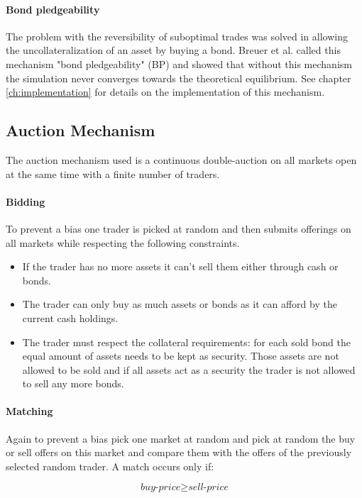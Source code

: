 \documentclass[../Bachelorarbeit.tex]{subfiles}
\begin{document}
\paragraph{Bond pledgeability}
The problem with the reversibility of suboptimal trades was solved in allowing the uncollateralization of an asset by buying a bond. Breuer et al. called this mechanism "bond pledgeability" (BP) and showed that without this mechanism the simulation never converges towards the theoretical equilibrium. See chapter \ref{ch:implementation} for details on the implementation of this mechanism.

\subsection{Auction Mechanism}
\label{sec:AUCTION_MECHANISM}
The auction mechanism used is a continuous double-auction on all markets open at the same time with a finite number of traders.

\paragraph{Bidding}
To prevent a bias one trader is picked at random and then submits offerings on all markets while respecting the following constraints.

\begin{itemize}
\item If the trader has no more assets it can't sell them either through cash or bonds.
\item The trader can only buy as much assets or bonds as it can afford by the current cash holdings.
\item The trader must respect the collateral requirements: for each sold bond the equal amount of assets needs to be kept as security. Those assets are not allowed to be sold and if all assets act as a security the trader is not allowed to sell any more bonds.
\end{itemize}

\paragraph{Matching}
Again to prevent a bias pick one market at random and pick at random the buy or sell offers on this market and compare them with the offers of the previously selected random trader. A match occurs only if:

\begin{equation}
\textit{buy-price} \geq \textit{sell-price}
\end{equation}
\end{document}
